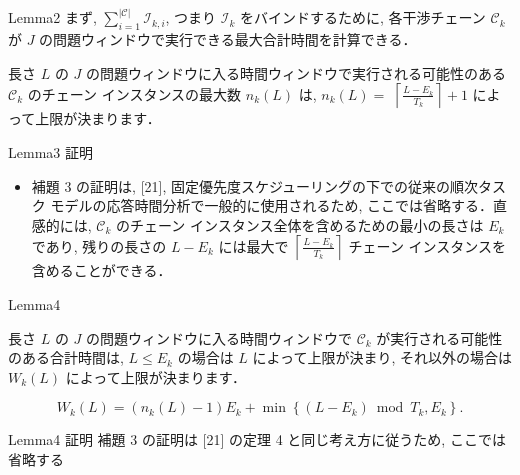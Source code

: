\begin{frame}{Lemma2}
    まず, $\sum_{i=1}^{|\mathcal{C}|} \mathcal{I}_{k, i}$, つまり $\mathcal{I}_{k}$ をバインドするために, 各干渉チェーン $\mathcal{C}_{k}$ が $J$ の問題ウィンドウで実行できる最大合計時間を計算できる．

    \begin{lemma}[]
        長さ $L$ の $J$ の問題ウィンドウに入る時間ウィンドウで実行される可能性のある $\mathcal{C}_{k}$ のチェーン インスタンスの最大数 $n_{k}(L)$ は, $n_{k}(L)=$  $\left\lceil\frac{L-E_{k}}{T_{k}}\right\rceil+1$ によって上限が決まります．
    \end{lemma}
\end{frame}

\begin{frame}{Lemma3 証明}
    \begin{itemize}
        \item 補題 3 の証明は, [21], 固定優先度スケジューリングの下での従来の順次タスク モデルの応答時間分析で一般的に使用されるため, ここでは省略する．直感的には, $\mathcal{C}_{k}$ のチェーン インスタンス全体を含めるための最小の長さは $E_{k}$ であり, 残りの長さの $L-E_{k}$ には最大で $\left\lceil\frac{L-E_{k}}{T_{k}}\right\rceil$ チェーン インスタンスを含めることができる．
    \end{itemize}
\end{frame}

\begin{frame}{Lemma4}
    \begin{lemma}[]
        長さ $L$ の $J$ の問題ウィンドウに入る時間ウィンドウで $\mathcal{C}_{k}$ が実行される可能性のある合計時間は, $L \leq E_{k}$ の場合は $L$ によって上限が決まり, それ以外の場合は $W_{k}(L)$ によって上限が決まります．

        \begin{equation*}
            W_{k}(L)=\left(n_{k}(L)-1\right) E_{k}+\min \left\{\left(L-E_{k}\right) \bmod T_{k}, E_{k}\right\} .
        \end{equation*}
    \end{lemma}
\end{frame}

\begin{frame}{Lemma4 証明}
    補題 3 の証明は [21] の定理 4 と同じ考え方に従うため, ここでは省略する
\end{frame}

\begin{frame}{}
\end{frame}

